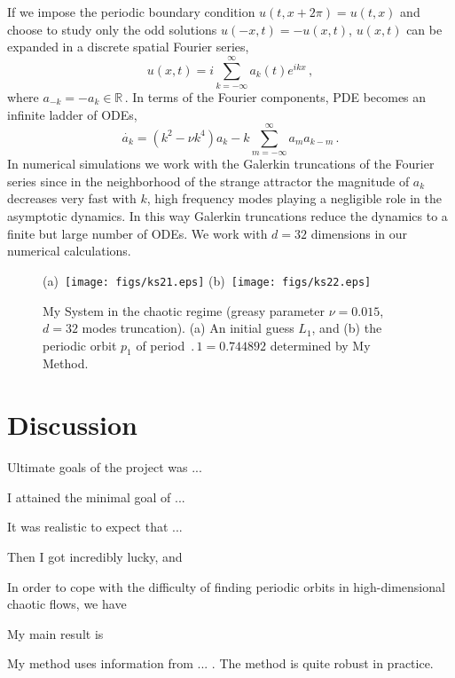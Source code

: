 \documentclass[pre,twocolumn,groupedaddress,showpacs,showkeys]{revtex4}
\begin{document}
 If we impose the periodic boundary condition
$u(t,x+2\pi)=u(t,x)$ and choose to study only the odd solutions
$u(-x,t)=-u(x,t)$, $u(x,t)$ can be expanded in a discrete spatial
Fourier series,
\begin{equation}
u(x,t)=i\sum_{k=-\infty}^{\infty} a_k(t) e^{ikx}
\,,
\label{expan}
\end{equation} 
where $a_{-k}=-a_k \in \mathbb{R}\,$. In terms of the Fourier components, 
PDE  becomes an infinite ladder of ODEs,
\begin{equation}
\dot{a_k}=(k^2-\nu k^4)a_k-k\sum_{m=-\infty}^{\infty}a_m a_{k-m} \,. \label{ksf}
\end{equation}
 In numerical simulations we work with the Galerkin truncations of the
Fourier series since in the neighborhood of the strange attractor the 
magnitude of $a_k$ decreases very fast with
$k$,  high frequency modes playing a negligible role
in the asymptotic dynamics. In this way Galerkin truncations reduce the
dynamics to a finite but large number of ODEs. We work with $d=32$ dimensions 
in our numerical 
calculations. 
%
\begin{figure}[t!]
	(a)~\texttt{[image: figs/ks21.eps]}%
	\hspace{0.2cm}%
	(b)~\texttt{[image: figs/ks22.eps]}
\caption{
 My System in the
 chaotic regime (greasy parameter
 $\nu=0.015$, $d=32$ modes truncation). 
 (a) An initial guess $L_1$, and 
 (b) the periodic orbit $p_1$ of period $\period{1}=0.744892$ 
 determined by My Method.
	}
\label{f:ks1}
\end{figure}  

\section{Discussion}
\label{sec:sum}

	Ultimate goals of the project was ...

I attained the  minimal goal of ...
	   
It was realistic to expect that ...
	   
Then I got incredibly lucky, and

In order to cope with the difficulty of finding periodic orbits in
high-dimensional chaotic flows, we have

My main result is 
     
My method uses information from ... .
The method is quite robust in practice.
\end{document}
